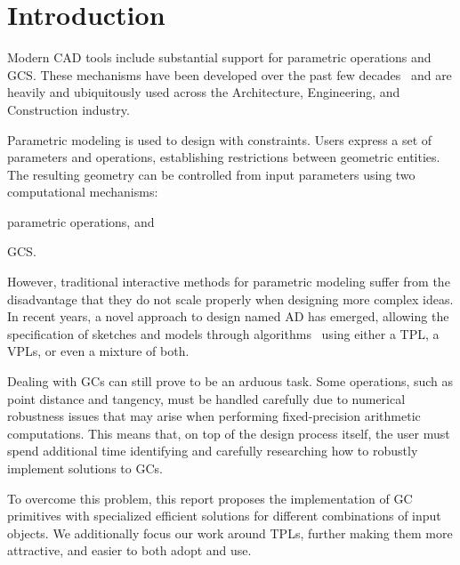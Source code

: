 \section{Introduction}%
\label{sec:intro}

Modern \ac{CAD} tools include substantial support for parametric operations and
\ac{GCS}.  These mechanisms have been developed over the past few
decades~\cite{Bettig:2011:GCSPC} and are heavily and ubiquitously used across
the Architecture, Engineering, and Construction industry.

Parametric modeling is used to design with constraints.  Users express a set of
parameters and operations, establishing restrictions between geometric entities.
The resulting geometry can be controlled from input parameters using two
computational mechanisms:
\begin{enumerate*}[label= (\arabic*)]
  \item parametric operations, and
  \item \ac{GCS}.
\end{enumerate*}

However, traditional interactive methods for parametric modeling suffer from the
disadvantage that they do not scale properly when designing more complex ideas.
In recent years, a novel approach to design named \ac{AD} has emerged, allowing
the specification of sketches and models through
algorithms~\cite{McCormack:2004:GDPDR} using either a \ac{TPL}, a \acp{VPL}, or
even a mixture of both.

Dealing with \acp{GC} can still prove to be an arduous task.  Some operations,
such as point distance and tangency, must be handled carefully due to numerical
robustness issues that may arise when performing fixed-precision arithmetic
computations.  This means that, on top of the design process itself, the user
must spend additional time identifying and carefully researching how to robustly
implement solutions to \acp{GC}.

To overcome this problem, this report proposes the implementation of \ac{GC}
primitives with specialized efficient solutions for different combinations of
input objects.  We additionally focus our work around \acp{TPL}, further making
them more attractive, and easier to both adopt and use.





